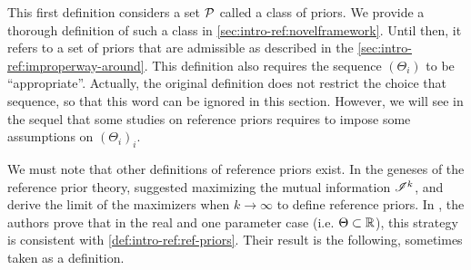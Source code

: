 This first definition considers a set $\mathcal{P}$ called a class of priors. 
We provide a thorough definition of such a class in \cref{sec:intro-ref:novelframework}.
Until then, it refers to a set of priors that are admissible as described in the \cref{sec:intro-ref:improperway-around}.
This definition also
requires the sequence $(\Theta_i)$ to be ``appropriate''.
Actually,  the original definition does not restrict the choice that sequence, so that this word can be ignored in this section.
However, we will see in the sequel that some studies on reference priors requires to impose some assumptions on $(\Theta_i)_i$. 





We must note that other definitions of reference priors exist.
In the geneses of the reference prior theory, \citet{bernardo_reference_1979} suggested maximizing the mutual information $\mathscr{I}^k$, and derive the limit of the maximizers when $k\to\infty$ to define reference priors.
In \cite{berger_formal_2009}, the authors prove that in the real and one parameter case (i.e. $\Theta\subset\mathbb{R}$), this strategy is consistent with \cref{def:intro-ref:ref-priors}. Their result is the following, sometimes taken as a definition.

